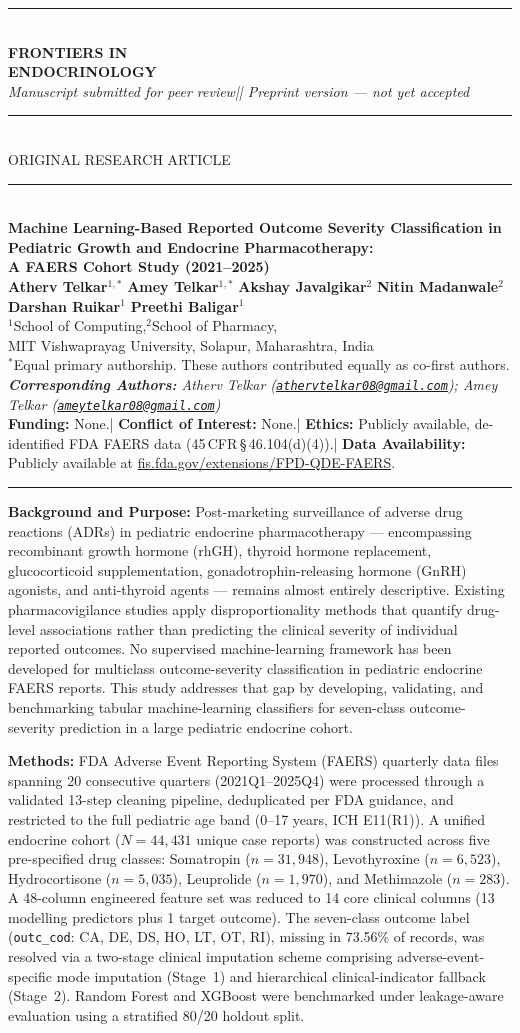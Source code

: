 \documentclass[10pt,twocolumn]{article}
\makeatletter
\newcommand{\FAERS}{\textsf{FAERS}\xspace}
\def\@maketitle{%
\newpage
\begin{center}
\leavevmode
{\color{jpbiBlue}\rule{\textwidth}{2pt}}\\[0.5pt]
{\Large\bfseries\color{jpbiBlue}
  FRONTIERS IN\\
  ENDOCRINOLOGY}\\[0pt]
{\small\itshape\color{jpbiMid}
  Manuscript submitted for peer review\enspace|\enspace
  2026\enspace|\enspace
  Preprint version --- not yet accepted}\\[0.5pt]
{\color{jpbiBlue}\rule{\textwidth}{0.5pt}}\\[0.5pt]
{\footnotesize\color{jpbiAccent}
  \MakeUppercase{Original Research Article}}\\[0.5pt]
{\color{jpbiBlue}\rule{\textwidth}{0.5pt}}\\[1pt]
{\LARGE\bfseries\color{jpbiBlue}
  Machine Learning-Based Reported Outcome Severity Classification in\\
  Pediatric Growth and Endocrine Pharmacotherapy:\\
  A FAERS Cohort Study (2021--2025)}\\[2pt]
{\small
  \textbf{Atherv Telkar}$^{1,*}$\quad
  \textbf{Amey Telkar}$^{1,*}$\quad
  \textbf{Akshay Javalgikar}$^{2}$\quad
  \textbf{Nitin Madanwale}$^{2}$\quad
  \textbf{Darshan Ruikar}$^{1}$\quad
  \textbf{Preethi Baligar}$^{1}$}\\[2pt]
{\scriptsize
  $^{1}$School of Computing,\quad $^{2}$School of Pharmacy,\\
  MIT Vishwaprayag University, Solapur, Maharashtra, India\\[0pt]
  $^{*}$Equal primary authorship. These authors contributed
  equally as co-first authors.}\\[1pt]
{\scriptsize\itshape
  \textbf{Corresponding Authors:}\enspace
  Atherv Telkar
  (\href{mailto:athervtelkar08@gmail.com}
  {\texttt{athervtelkar08@gmail.com}});\quad
  Amey Telkar
  (\href{mailto:ameytelkar08@gmail.com}
  {\texttt{ameytelkar08@gmail.com}})}\\[2pt]
{\scriptsize\color{black!80}
  \textbf{Funding:} None.\quad|\quad
  \textbf{Conflict of Interest:} None.\quad|\quad
  \textbf{Ethics:} Publicly available, de-identified FDA \FAERS data (45\,CFR\,\S\,46.104(d)(4)).\quad|\quad
  \textbf{Data Availability:} Publicly available at \href{https://fis.fda.gov/extensions/FPD-QDE-FAERS/FPD-QDE-FAERS.html}{fis.fda.gov/extensions/FPD-QDE-FAERS}.}\\[1pt]
{\color{jpbiBlue}\rule{\textwidth}{1.5pt}}
\end{center}}
\makeatother
\begin{document}
 
\onecolumn
\enlargethispage{1.5cm}
\makeatletter\@maketitle\makeatother
 
\begin{tcolorbox}[absbox, title={Structured Abstract}, colbacktitle=jpbiBlue!8, coltitle=jpbiBlue, fonttitle=\small\bfseries\centering\MakeUppercase, toptitle=2pt, bottomtitle=2pt, top=1.5pt, bottom=1.5pt]
\footnotesize
\noindent\textbf{Background and Purpose:}
Post-marketing surveillance of adverse drug reactions (ADRs) in pediatric endocrine pharmacotherapy --- encompassing recombinant growth hormone (rhGH), thyroid hormone replacement, glucocorticoid supplementation, gonadotrophin-releasing hormone (GnRH) agonists, and anti-thyroid agents --- remains almost entirely descriptive. Existing pharmacovigilance studies apply disproportionality methods that quantify drug-level associations rather than predicting the clinical severity of individual reported outcomes. No supervised machine-learning framework has been developed for multiclass outcome-severity classification in pediatric endocrine \FAERS reports. This study addresses that gap by developing, validating, and benchmarking tabular machine-learning classifiers for seven-class outcome-severity prediction in a large pediatric endocrine cohort.
 
\par\vspace{1.5pt}\noindent\textbf{Methods:}
FDA Adverse Event Reporting System (\FAERS) quarterly data files spanning 20 consecutive quarters (2021Q1--2025Q4) were processed through a validated 13-step cleaning pipeline, deduplicated per FDA guidance, and restricted to the full pediatric age band (0--17 years, ICH E11(R1)). A unified endocrine cohort ($N = 44{,}431$ unique case reports) was constructed across five pre-specified drug classes: Somatropin ($n = 31{,}948$), Levothyroxine ($n = 6{,}523$), Hydrocortisone ($n = 5{,}035$), Leuprolide ($n = 1{,}970$), and Methimazole ($n = 283$). A 48-column engineered feature set was reduced to 14 core clinical columns (13 modelling predictors plus 1 target outcome). The seven-class outcome label (\texttt{outc\_cod}: CA, DE, DS, HO, LT, OT, RI), missing in 73.56\% of records, was resolved via a two-stage clinical imputation scheme comprising adverse-event-specific mode imputation (Stage~1) and hierarchical clinical-indicator fallback (Stage~2). Random Forest and XGBoost were benchmarked under leakage-aware evaluation using a stratified 80/20 holdout split.
 

\end{tcolorbox}
\end{document}
